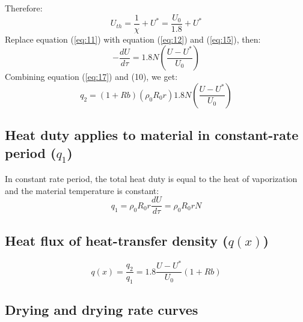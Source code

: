 Therefore:
\begin{equation} \label{eq:16}
    U_{th} = \frac{1}{\chi} + U^* = \frac{U_0}{1.8} + U^*
\end{equation}
Replace equation (\ref{eq:11}) with equation (\ref{eq:12}) and (\ref{eq:15}), then:
\begin{equation} \label{eq:17}
    -\frac{dU}{d\tau} = 1.8 N \left(\frac{U - U^*}{U_0}\right)
\end{equation}
Combining equation (\ref{eq:17}) and (10), we get:
\begin{equation}
    q_2 = (1 + Rb)(\rho_0 R_0 r) 1.8 N \left(\frac{U - U^*}{U_0}\right)
\end{equation}

\subsection{Heat duty applies to material in constant-rate period ($q_1$)}
In constant rate period, the total heat duty is equal to the heat of vaporization and the material temperature is constant:
\begin{equation}
    q_1 = \rho_0 R_0 r \frac{dU}{d\tau} = \rho_0 R_0 r N
\end{equation}

\subsection{Heat flux of heat-transfer density ($q(x)$)}
\begin{equation}
    q(x) = \frac{q_2}{q_1} = 1.8 \frac{U - U^*}{U_0} (1 + Rb)
\end{equation}

\subsection{Drying and drying rate curves}
